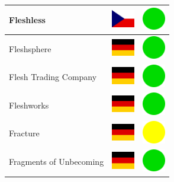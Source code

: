 \documentclass[12pt, a4paper, twoside]{report}
\begin{document}
\begin{center}
\begin{longtable}{|p{5cm}|p{2cm}|p{2cm}|}
 Fleshless                                                  & \includegraphics[width=1cm]{../img/flags/cz} &   \includegraphics[width=1cm]{../likes/y} \\ \hline
 Fleshsphere                                                & \includegraphics[width=1cm]{../img/flags/de} &   \includegraphics[width=1cm]{../likes/y} \\ \hline
 Flesh Trading Company                                      & \includegraphics[width=1cm]{../img/flags/de} &   \includegraphics[width=1cm]{../likes/y} \\ \hline
 Fleshworks                                                 & \includegraphics[width=1cm]{../img/flags/de} &   \includegraphics[width=1cm]{../likes/y} \\ \hline
 Fracture                                                   & \includegraphics[width=1cm]{../img/flags/de} &   \includegraphics[width=1cm]{../likes/m} \\ \hline
 Fragments of Unbecoming                                    & \includegraphics[width=1cm]{../img/flags/de} &   \includegraphics[width=1cm]{../likes/y} \\ \hline

\end{longtable}
\end{center}
\end{document}
